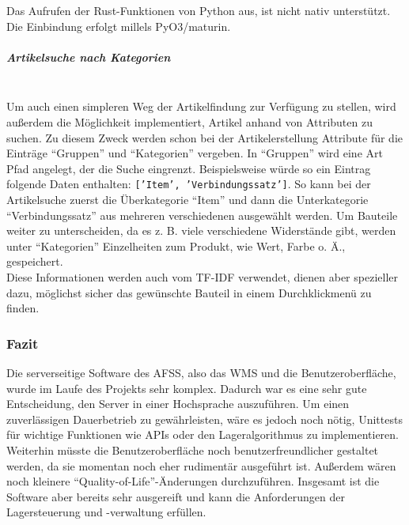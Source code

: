 Das Aufrufen der Rust-Funktionen von Python aus, ist nicht nativ unterstützt. Die Einbindung erfolgt millels PyO3/maturin.

\subparagraph{Artikelsuche nach Kategorien}\mbox{}\\
Um auch einen simpleren Weg der Artikelfindung zur Verfügung zu stellen, wird außerdem die Möglichkeit implementiert, Artikel anhand von Attributen zu suchen. Zu diesem Zweck werden schon bei der Artikelerstellung Attribute für die Einträge \enquote{Gruppen} und \enquote{Kategorien} vergeben. In \enquote{Gruppen} wird eine Art Pfad angelegt, der die Suche eingrenzt. Beispielsweise würde so ein Eintrag folgende Daten enthalten: \texttt{['{Item}', '{Verbindungssatz}']}. So kann bei der Artikelsuche zuerst die Überkategorie \enquote{Item} und dann die Unterkategorie \enquote{Verbindungssatz} aus mehreren verschiedenen ausgewählt werden. Um Bauteile weiter zu unterscheiden, da es z. B. viele verschiedene Widerstände gibt, werden unter \enquote{Kategorien} Einzelheiten zum Produkt, wie Wert, Farbe o. Ä., gespeichert.\\  
Diese Informationen werden auch vom TF-IDF verwendet, dienen aber spezieller dazu, möglichst sicher das gewünschte Bauteil in einem Durchklickmenü zu finden.


\subsubsection{Fazit}
Die serverseitige Software des AFSS, also das WMS und die Benutzeroberfläche, wurde im Laufe des Projekts sehr komplex. Dadurch war es eine sehr gute Entscheidung, den Server in einer Hochsprache auszuführen.
Um einen zuverlässigen Dauerbetrieb zu gewährleisten, wäre es jedoch noch nötig, Unittests für wichtige Funktionen wie APIs oder den Lageralgorithmus zu implementieren. Weiterhin müsste die Benutzeroberfläche noch benutzerfreundlicher gestaltet werden, da sie momentan noch eher rudimentär ausgeführt ist. Außerdem wären noch kleinere 
\enquote{Quality-of-Life}-Änderungen durchzuführen. Insgesamt ist die Software aber bereits sehr ausgereift und kann die Anforderungen der Lagersteuerung und -verwaltung erfüllen.


